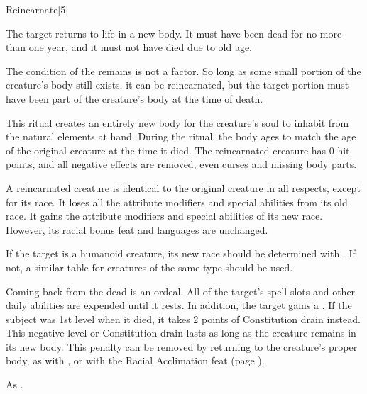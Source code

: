 \begin{spellsection}{Reincarnate}[5]
    \begin{spellheader}
    \end{spellheader}
    \begin{spellcontent}
        \begin{spelltargetinginfo}
        \end{spelltargetinginfo}
        \begin{spelleffects}
            \spelleffect The target returns to life in a new body. It must have been dead for no more than one year, and it must not have died due to old age.

            The condition of the remains is not a factor. So long as some small portion of the creature's body still exists, it can be reincarnated, but the target portion must have been part of the creature's body at the time of death.

            This ritual creates an entirely new body for the creature's soul to inhabit from the natural elements at hand. During the ritual, the body ages to match the age of the original creature at the time it died. The reincarnated creature has 0 hit points, and all negative effects are removed, even curses and missing body parts.

            A reincarnated creature is identical to the original creature in all respects, except for its race. It loses all the attribute modifiers and special abilities from its old race. It gains the attribute modifiers and special abilities of its new race. However, its racial bonus feat and languages are unchanged.

            If the target is a humanoid creature, its new race should be determined with . If not, a similar table for creatures of the same type should be used.

            Coming back from the dead is an ordeal. All of the target's spell slots and other daily abilities are expended until it rests. In addition, the target gains a \negativelevel. If the subject was 1st level when it died, it takes 2 points of Constitution drain instead. This negative level or Constitution drain lasts as long as the creature remains in its new body. This penalty can be removed by returning to the creature's proper body, as with , or with the Racial Acclimation feat (page ).
        \end{spelleffects}
    \end{spellcontent}
    \begin{spellfooter}
        \spellnotes As .
    \end{spellfooter}
\end{spellsection}
